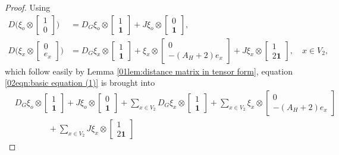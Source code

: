 \documentclass[12pt,a4paper]{article}
\newcommand{\1}{{\bm 1}}
\numberwithin{equation}{section}
\begin{document}
\begin{proof}
Using
%
\begin{align*}
D\bigg(\xi_o\otimes \begin{bmatrix} 1 \\ 0 \end{bmatrix}\bigg)
&=D_G\xi_o\otimes \begin{bmatrix} 1 \\ \mathbf{1} \end{bmatrix}
 +J\xi_o\otimes \begin{bmatrix} 0 \\ \mathbf{1} \end{bmatrix},
\\
D\bigg(\xi_x\otimes \begin{bmatrix} 0 \\ e_x \end{bmatrix}\bigg)
&=D_G\xi_x\otimes \begin{bmatrix} 1 \\ \mathbf{1} \end{bmatrix}
 +\xi_x\otimes \begin{bmatrix} 0 \\ -(A_H+2)e_x \end{bmatrix}
 +J\xi_x\otimes \begin{bmatrix} 1 \\ 2\mathbf{1} \end{bmatrix},
\quad x\in V_2,
\end{align*}
%
which follow easily by 
Lemma \ref{01lem:distance matrix in tensor form},
equation \eqref{02eqn:basic equation (1)} is brought into
\begin{align*}
&D_G\xi_o\otimes \begin{bmatrix} 1 \\ \bm{1} \end{bmatrix}
 +J\xi_o\otimes \begin{bmatrix} 0 \\ \bm{1} \end{bmatrix}
 +\sum_{x\in V_2} 
  D_G\xi_x\otimes \begin{bmatrix} 1 \\ \mathbf{1} \end{bmatrix}
 +\sum_{x\in V_2} 
  \xi_x\otimes \begin{bmatrix} 0 \\ -(A_H+2)e_x \end{bmatrix} 
\\
&\qquad \qquad
 +\sum_{x\in V_2} 
  J\xi_x\otimes \begin{bmatrix} 1 \\ 2\mathbf{1} \end{bmatrix}

\end{align*}
\end{proof}
\end{document}
